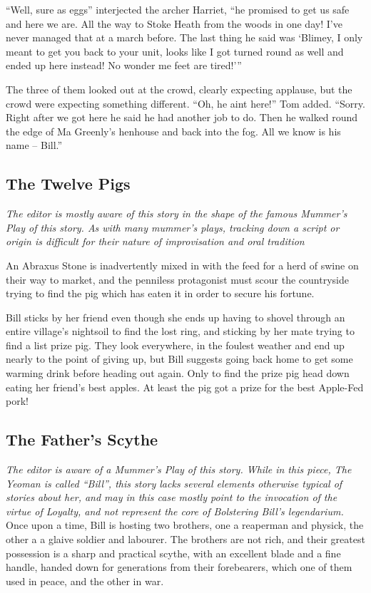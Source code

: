 “Well, sure as eggs” interjected the archer Harriet, “he promised to get us safe and here we are. All the way to Stoke Heath from the woods in one day! I've never managed that at a march before. The last thing he said was ‘Blimey, I only meant to get you back to your unit, looks like I got turned round as well and ended up here instead! No wonder me feet are tired!’”

The three of them looked out at the crowd, clearly expecting applause, but the crowd were expecting something different. “Oh, he aint here!” Tom added. “Sorry. Right after we got here he said he had another job to do. Then he walked round the edge of Ma Greenly's henhouse and back into the fog. All we know is his name -- Bill.”
\subsection{The Twelve Pigs}
\textit{The editor is mostly aware of this story in the shape of the famous Mummer’s Play of this story. As with many mummer's plays, tracking down a script or origin is difficult for their nature of improvisation and oral tradition}

An Abraxus Stone is inadvertently mixed in with the feed for a herd of swine on their way to market, and the penniless protagonist must scour the countryside trying to find the pig which has eaten it in order to secure his fortune. 

Bill sticks by her friend even though she ends up having to shovel through an entire village's nightsoil to find the lost ring, and sticking by her mate trying to find a list prize pig. They look everywhere, in the foulest weather and end up nearly to the point of giving up, but Bill suggests going back home to get some warming drink before heading out again. Only to find the prize pig head down eating her friend's best apples. At least the pig got a prize for the best Apple-Fed pork!
\subsection{The Father's Scythe}
\textit{The editor is aware of a Mummer’s Play of this story. While in this piece, The Yeoman is called “Bill”, this story lacks several elements otherwise typical of stories about her, and may in this case mostly point to the invocation of the virtue of Loyalty, and not represent the core of Bolstering Bill's legendarium.}
Once upon a time, Bill is hosting two brothers, one a reaperman and physick, the other a a glaive soldier and labourer. The brothers are not rich, and their greatest possession is a sharp and practical scythe, with an excellent blade and a fine handle, handed down for generations from their forebearers, which one of them used in peace, and the other in war.

